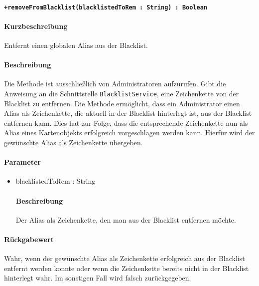 \paragraph*{\texttt{+removeFromBlacklist(blacklistedToRem : String) : Boolean}}%
\paragraph*{Kurzbeschreibung}
Entfernt einen globalen Alias aus der Blacklist.
\paragraph*{Beschreibung}
Die Methode ist ausschließlich von Administratoren aufzurufen.
Gibt die Anweisung an die Schnittstelle \texttt{BlacklistService}, eine Zeichenkette von der Blacklist zu entfernen.
Die Methode ermöglicht, dass ein Administrator einen Alias als Zeichenkette, die aktuell in der Blacklist hinterlegt ist, aus der Blacklist entfernen kann.
Dies hat zur Folge, dass die entsprechende Zeichenkette nun als Alias eines Kartenobjekts erfolgreich vorgeschlagen werden kann.
Hierfür wird der gewünschte Alias als Zeichenkette übergeben.
\paragraph*{Parameter}
\begin{itemize}
    \item blacklistedToRem : String
    		\paragraph*{Beschreibung}
    		Der Alias als Zeichenkette, den man aus der Blacklist entfernen möchte.
\end{itemize}
\paragraph*{Rückgabewert}
Wahr, wenn der gewünschte Alias als Zeichenkette erfolgreich aus der Blacklist entfernt werden konnte oder wenn die Zeichenkette bereits nicht in der Blacklist hinterlegt wahr. Im sonstigen Fall wird falsch zurückgegeben.
